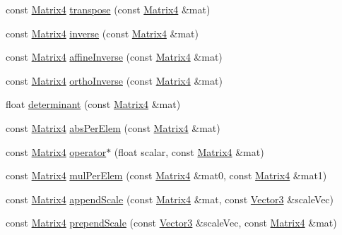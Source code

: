 \begin{DoxyCompactItemize}
\item 
const \hyperlink{classVectormath_1_1Aos_1_1Matrix4}{Matrix4} \hyperlink{namespaceVectormath_1_1Aos_ad4e9d783c7a85f2fa6f1f4f43380b50d}{transpose} (const \hyperlink{classVectormath_1_1Aos_1_1Matrix4}{Matrix4} \&mat)
\item 
const \hyperlink{classVectormath_1_1Aos_1_1Matrix4}{Matrix4} \hyperlink{namespaceVectormath_1_1Aos_a0bf953e20e9be86cb84af34dbd8239bb}{inverse} (const \hyperlink{classVectormath_1_1Aos_1_1Matrix4}{Matrix4} \&mat)
\item 
const \hyperlink{classVectormath_1_1Aos_1_1Matrix4}{Matrix4} \hyperlink{namespaceVectormath_1_1Aos_ab59e04ee1f9264396c5177bb444eb185}{affine\-Inverse} (const \hyperlink{classVectormath_1_1Aos_1_1Matrix4}{Matrix4} \&mat)
\item 
const \hyperlink{classVectormath_1_1Aos_1_1Matrix4}{Matrix4} \hyperlink{namespaceVectormath_1_1Aos_a33a543c80d4bcdfe8e0293ceedec4178}{ortho\-Inverse} (const \hyperlink{classVectormath_1_1Aos_1_1Matrix4}{Matrix4} \&mat)
\item 
float \hyperlink{namespaceVectormath_1_1Aos_ab5cebae6e72069d8067db4f7ffb1ca6b}{determinant} (const \hyperlink{classVectormath_1_1Aos_1_1Matrix4}{Matrix4} \&mat)
\item 
const \hyperlink{classVectormath_1_1Aos_1_1Matrix4}{Matrix4} \hyperlink{namespaceVectormath_1_1Aos_a62fb683a9a02ac6b0afd58ad3720ffa7}{abs\-Per\-Elem} (const \hyperlink{classVectormath_1_1Aos_1_1Matrix4}{Matrix4} \&mat)
\item 
const \hyperlink{classVectormath_1_1Aos_1_1Matrix4}{Matrix4} \hyperlink{namespaceVectormath_1_1Aos_a1b761b907d8e962b160f43dbebca24ff}{operator$\ast$} (float scalar, const \hyperlink{classVectormath_1_1Aos_1_1Matrix4}{Matrix4} \&mat)
\item 
const \hyperlink{classVectormath_1_1Aos_1_1Matrix4}{Matrix4} \hyperlink{namespaceVectormath_1_1Aos_a97eb7c235cb7babd947c820701ab686e}{mul\-Per\-Elem} (const \hyperlink{classVectormath_1_1Aos_1_1Matrix4}{Matrix4} \&mat0, const \hyperlink{classVectormath_1_1Aos_1_1Matrix4}{Matrix4} \&mat1)
\item 
const \hyperlink{classVectormath_1_1Aos_1_1Matrix4}{Matrix4} \hyperlink{namespaceVectormath_1_1Aos_a7d0b2d488384159f8e86647039ea6d2c}{append\-Scale} (const \hyperlink{classVectormath_1_1Aos_1_1Matrix4}{Matrix4} \&mat, const \hyperlink{classVectormath_1_1Aos_1_1Vector3}{Vector3} \&scale\-Vec)
\item 
const \hyperlink{classVectormath_1_1Aos_1_1Matrix4}{Matrix4} \hyperlink{namespaceVectormath_1_1Aos_aa1ef6911a581b2d067a0fe5792cd4648}{prepend\-Scale} (const \hyperlink{classVectormath_1_1Aos_1_1Vector3}{Vector3} \&scale\-Vec, const \hyperlink{classVectormath_1_1Aos_1_1Matrix4}{Matrix4} \&mat)

\end{DoxyCompactItemize}
